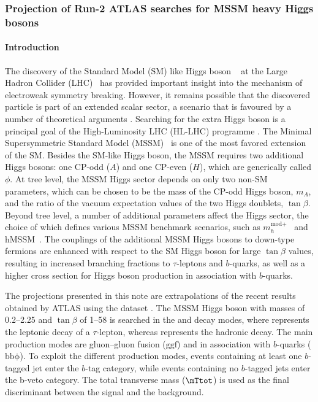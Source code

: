 \subsubsection{Projection of Run-2 ATLAS searches for MSSM heavy Higgs bosons}
\paragraph{Introduction}
\label{sec:intro}

The discovery of the Standard Model (SM) like Higgs boson ~\cite{ATLASHiggsJuly2012, CMSHiggsJuly2012}
at the Large Hadron Collider (LHC)~\cite{LHC} has provided important insight into the mechanism of 
electroweak symmetry breaking. However, it remains possible that the discovered particle is part 
of an extended scalar sector, a scenario that is favoured by a number of theoretical arguments 
\cite{Djouadi:2005gj,Branco:2011iw}. Searching for the extra Higgs boson is a principal goal of 
the High-Luminosity LHC (HL-LHC) programme \cite{ecfa15}. The Minimal Supersymmetric Standard 
Model (MSSM)~\cite{Djouadi:2005gj,Fayet:1976et,Fayet:1977yc} is one of the most favored extension 
of the SM. Besides the SM-like Higgs boson, the MSSM requires two additional Higgs bosons: 
one CP-odd ($A$) and one CP-even ($H$), which are generically called $\phi$. 
At tree level, the MSSM Higgs sector depends on only two non-SM parameters, which can be chosen 
to be the mass of the CP-odd Higgs boson, $m_A$, and the ratio of the vacuum expectation values 
of the two Higgs doublets, $\tan\beta$. Beyond tree level, a number of additional parameters 
affect the Higgs sector, the choice of which defines various MSSM benchmark scenarios, such as 
$m_{h}^{\text{mod}+}$~\cite{MSSMBenchmarks} and hMSSM~\cite{Djouadi:2013uqa,Bagnaschi:2015hka}.  
The couplings of the additional MSSM Higgs bosons to down-type fermions are enhanced with respect to 
the SM Higgs boson for large $\tan\beta$ values, resulting in increased branching fractions to 
$\tau$-leptons and $b$-quarks, as well as a higher cross section for Higgs boson production
in association with $b$-quarks.

The projections presented in this note are extrapolations of the recent results obtained by ATLAS
using the \RunTwo dataset \cite{ATLASRun2Ditau}.  The MSSM Higgs boson with masses of 
0.2--\SI{2.25}{\UTeV} and $\tan\beta$ of 1--58 is searched in the \lephad and \hadhad decay modes, 
where \taulep represents the leptonic decay of a $\tau$-lepton, whereas \tauhad represents 
the hadronic decay. The main production modes are gluon--gluon fusion ($\mathrm{ggf}$) and in association 
with $b$-quarks ($\mathrm{bb\phi}$).  
To exploit the different production modes, events containing at least one $b$-tagged jet enter 
the $b$-tag category, while events containing no $b$-tagged jets enter the b-veto category.
The total transverse mass ($\mTtot$) is used as the final discriminant between the signal and the background. 

